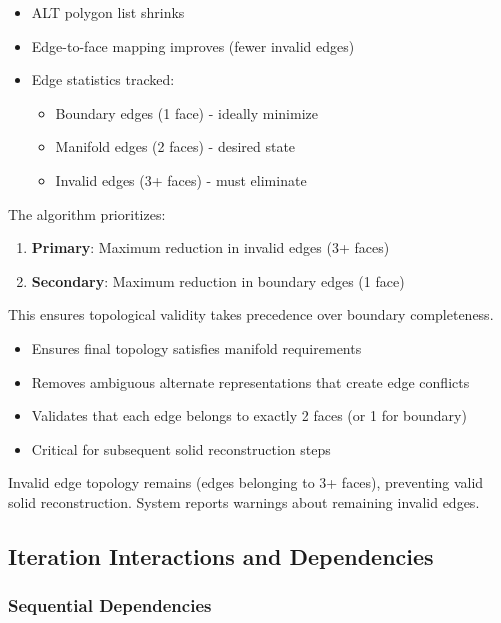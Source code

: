 \begin{itemize}
    \item ALT polygon list shrinks
    \item Edge-to-face mapping improves (fewer invalid edges)
    \item Edge statistics tracked:
    \begin{itemize}
        \item Boundary edges (1 face) - ideally minimize
        \item Manifold edges (2 faces) - desired state
        \item Invalid edges (3+ faces) - must eliminate
    \end{itemize}
\end{itemize}

The algorithm prioritizes:
\begin{enumerate}
    \item \textbf{Primary}: Maximum reduction in invalid edges (3+ faces)
    \item \textbf{Secondary}: Maximum reduction in boundary edges (1 face)
\end{enumerate}

This ensures topological validity takes precedence over boundary completeness.

\begin{itemize}
    \item Ensures final topology satisfies manifold requirements
    \item Removes ambiguous alternate representations that create edge conflicts
    \item Validates that each edge belongs to exactly 2 faces (or 1 for boundary)
    \item Critical for subsequent solid reconstruction steps
\end{itemize}

Invalid edge topology remains (edges belonging to 3+ faces), preventing valid solid reconstruction. System reports warnings about remaining invalid edges.

\subsection{Iteration Interactions and Dependencies}

\subsubsection{Sequential Dependencies}

